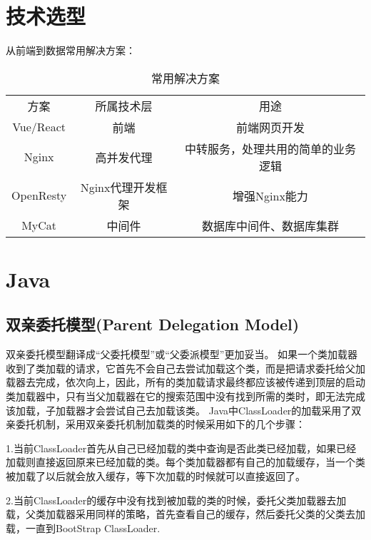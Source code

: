 \documentclass[../../../interview-questions.tex]{subfiles}
\begin{document}
\section{技术选型}

从前端到数据常用解决方案：


\begin{table}[htbp]
	\caption{常用解决方案}
	\label{table:solution}
	\begin{center}
		\begin{tabular}{|c|c|c|}
			\hline
			\multirow{1}{*}{方案}
			& \multicolumn{1}{c|}{所属技术层}
			& \multicolumn{1}{c|}{用途}\\			
			\cline{1-3}
			Vue/React & 前端 &  前端网页开发    \\
			\hline
			Nginx & 高并发代理 &  中转服务，处理共用的简单的业务逻辑    \\
			\hline
			OpenResty & Nginx代理开发框架 &  增强Nginx能力    \\
			\hline
			MyCat & 中间件 &  数据库中间件、数据库集群    \\
			\hline							
		\end{tabular}	
	\end{center}
\end{table}



\section{Java}

\subsection{双亲委托模型(Parent Delegation Model)}

双亲委托模型翻译成“父委托模型”或“父委派模型”更加妥当。
如果一个类加载器收到了类加载的请求，它首先不会自己去尝试加载这个类，而是把请求委托给父加载器去完成，依次向上，因此，所有的类加载请求最终都应该被传递到顶层的启动类加载器中，只有当父加载器在它的搜索范围中没有找到所需的类时，即无法完成该加载，子加载器才会尝试自己去加载该类。
Java中ClassLoader的加载采用了双亲委托机制，采用双亲委托机制加载类的时候采用如下的几个步骤：

1.当前ClassLoader首先从自己已经加载的类中查询是否此类已经加载，如果已经加载则直接返回原来已经加载的类。每个类加载器都有自己的加载缓存，当一个类被加载了以后就会放入缓存，等下次加载的时候就可以直接返回了。

2.当前ClassLoader的缓存中没有找到被加载的类的时候，委托父类加载器去加载，父类加载器采用同样的策略，首先查看自己的缓存，然后委托父类的父类去加载，一直到BootStrap ClassLoader.
\end{document}
